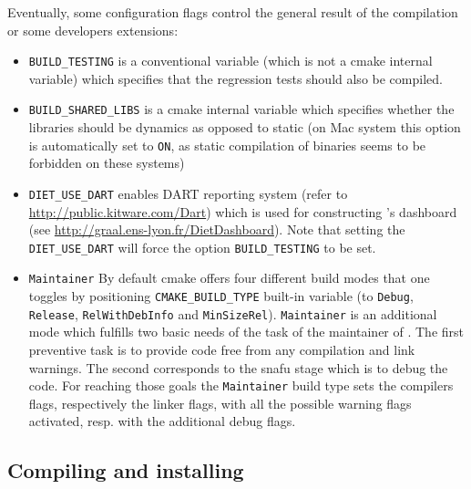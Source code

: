 Eventually, some configuration flags control the general result of the
compilation or some developers extensions:
\begin{itemize}
\item
  \verb+BUILD_TESTING+ is a conventional variable (which is not a
  cmake internal variable) which specifies that the regression tests
  should also be compiled.

\item
  \verb+BUILD_SHARED_LIBS+ is a cmake internal variable which
  specifies whether the libraries should be dynamics as opposed to
  static (on Mac system this option is automatically set to \verb!ON!,
  as static compilation of binaries seems to be forbidden on these
  systems)

\item
  \verb+DIET_USE_DART+ enables DART reporting system (refer to
  \url{http://public.kitware.com/Dart}) which is used for constructing
  \diet's dashboard (see
  \url{http://graal.ens-lyon.fr/DietDashboard}).  Note that setting
  the \verb+DIET_USE_DART+ will force the option
  \linebreak\verb+BUILD_TESTING+ to be set.

\item
  \verb+Maintainer+ By default cmake offers four different build modes
  that one toggles by positioning \verb+CMAKE_BUILD_TYPE+ built-in
  variable (to \verb+Debug+, \verb+Release+, \verb+RelWithDebInfo+ and
  \verb+MinSizeRel+). \verb+Maintainer+ is an additional mode which
  fulfills two basic needs of the task of the maintainer of \diet. The
  first preventive task is to provide code free from any compilation
  and link warnings. The second corresponds to the snafu stage which
  is to debug the code. For reaching those goals the \verb+Maintainer+
  build type sets the compilers flags, respectively the linker flags,
  with all the possible warning flags activated, resp. with the
  additional debug flags.
\end{itemize}

\subsection{Compiling and installing}

